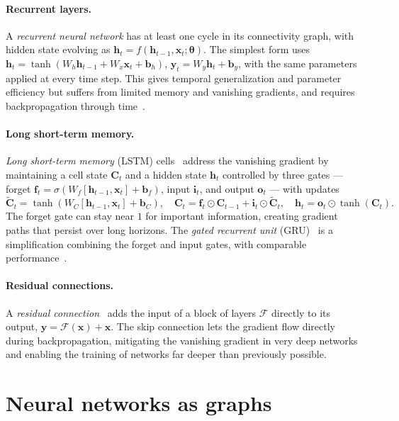 \paragraph{Recurrent layers.}
A \emph{recurrent neural network} has at least one cycle in its connectivity
graph, with hidden state evolving as
$\mathbf{h}_t = f(\mathbf{h}_{t-1}, \mathbf{x}_t; \boldsymbol{\theta})$. The
simplest form uses
$\mathbf{h}_t = \tanh(W_h \mathbf{h}_{t-1} + W_x \mathbf{x}_t + \mathbf{b}_h)$,
$\mathbf{y}_t = W_y \mathbf{h}_t + \mathbf{b}_y$, with the same parameters applied
at every time step. This gives temporal generalization and parameter efficiency
but suffers from limited memory and vanishing gradients, and requires
backpropagation through time~\citep{werbos1990bptt}.

\paragraph{Long short-term memory.}
\emph{Long short-term memory} (LSTM) cells~\citep{hochreiter1997long} address the
vanishing gradient by maintaining a cell state $\mathbf{C}_t$ and a hidden state
$\mathbf{h}_t$ controlled by three gates --- forget
$\mathbf{f}_t = \sigma(W_f [\mathbf{h}_{t-1}, \mathbf{x}_t] + \mathbf{b}_f)$,
input $\mathbf{i}_t$, and output $\mathbf{o}_t$ --- with updates
\[
  \tilde{\mathbf{C}}_t = \tanh(W_C [\mathbf{h}_{t-1}, \mathbf{x}_t] + \mathbf{b}_C),
  \quad \mathbf{C}_t = \mathbf{f}_t \odot \mathbf{C}_{t-1} + \mathbf{i}_t \odot \tilde{\mathbf{C}}_t,
  \quad \mathbf{h}_t = \mathbf{o}_t \odot \tanh(\mathbf{C}_t).
\]
The forget gate can stay near $1$ for important information, creating gradient
paths that persist over long horizons. The \emph{gated recurrent unit}
(GRU)~\citep{cho2014learning} is a simplification combining the forget and input
gates, with comparable performance~\citep{chung2014empirical}.

\paragraph{Residual connections.}
A \emph{residual connection}~\citep{he2016deep} adds the input of a block of
layers $\mathcal{F}$ directly to its output, $\mathbf{y} = \mathcal{F}(\mathbf{x})
+ \mathbf{x}$. The skip connection lets the gradient flow directly during
backpropagation, mitigating the vanishing gradient in very deep networks and
enabling the training of networks far deeper than previously possible.

\section{Neural networks as graphs}
\label{sec:found:nets-as-graphs}

